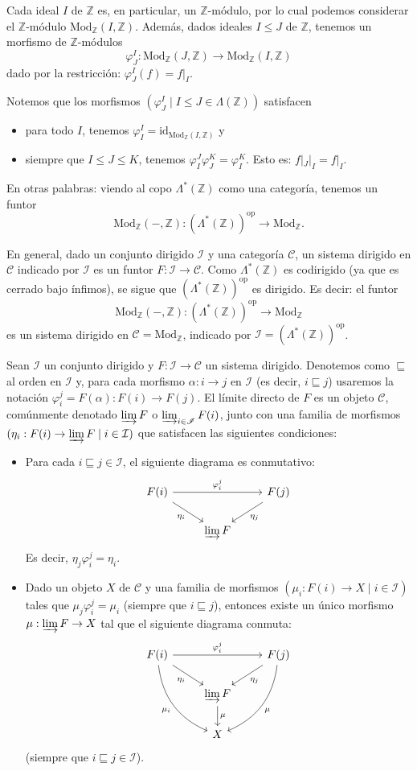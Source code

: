 \documentclass[12pt,letterpaper,titlepage]{article}
\theoremstyle{definition}
\renewcommand\phi{\varphi}
\newcommand\Z{\mathbb Z}
\renewcommand\cal[1]{\mathcal{#1}}
\newcommand\nti[1]{\Lambda^{\text{*}}({#1})}
\newcommand\scr[1]{\mathscr{#1}}
\newcommand\<{\langle}
\renewcommand\>{\rangle}
\newcommand{\Mod}{\mathrm{Mod}}
\newcommand{\id}{\mathrm{id}}
\newcommand{\op}{\mathrm{op}}
\begin{document}
Cada ideal $I$ de $\Z$ es, en particular, un $\Z$-módulo,
por lo cual podemos considerar el $\Z$-módulo $\Mod_\Z(I,\Z)$.
Además, dados ideales $I\leq J$ de $\Z$,
tenemos un morfismo de $\Z$-módulos
\[
    \phi^I_J:\Mod_\Z(J,\Z)\to\Mod_\Z(I,\Z)
\]
dado por la restricción: $\phi^I_J(f)=f|_I$.

Notemos que los morfismos $(\phi^I_J\mid I\leq J\in\Lambda(\Z))$
satisfacen
\begin{itemize}
    \item para todo $I$, tenemos $\phi^I_I=\id_{\Mod_\Z(I,\Z)}$ y
    \item siempre que $I\leq J\leq K$, tenemos
    $\phi^J_I\phi^K_J=\phi^K_I$. Esto es: $f|_J|_I=f|_I$.
\end{itemize}

En otras palabras: viendo al copo $\nti\Z$
como una categoría, tenemos un funtor
\[
    \Mod_\Z(-,\Z):(\nti\Z)^\op\to\Mod_\Z
.\]

En general, dado un conjunto dirigido $\scr I$
y una categoría $\cal C$,
un sistema dirigido en $\cal C$ indicado por $\scr I$
es un funtor $F:\scr I\to\cal C$.
Como $\nti\Z$ es codirigido (ya que es cerrado bajo ínfimos),
se sigue que $(\nti\Z)^\op$ es dirigido.
Es decir: el funtor
\[
    \Mod_\Z(-,\Z):(\nti\Z)^\op\to\Mod_\Z
\]
es un sistema dirigido en $\cal C=\Mod_\Z$,
indicado por $\scr I = (\nti\Z)^\op$.

Sean $\scr I$ un conjunto dirigido
y $F:\scr I\to\cal C$ un sistema dirigido.
Denotemos como $\sqsubseteq$ al orden en $\scr I$ y,
para cada morfismo $\alpha:i\to j$ en $\scr I$
(es decir, $i\sqsubseteq j$) usaremos la notación
$\phi_i^j=F(\alpha):F(i)\to F(j)$.
El límite directo de $F$ es un objeto $\cal C$,
comúnmente denotado $\varinjlim F$ o $\varinjlim_{i\in\scr I}F(i)$,
junto con una familia de morfismos
$(\eta_i:F(i)\to\varinjlim F \mid i\in\cal I)$
que satisfacen las siguientes condiciones:
\begin{itemize}
    \item Para cada $i\sqsubseteq j\in\scr I$,
    el siguiente diagrama es conmutativo:
    \[
        \begin{tikzcd}
            F(i) \ar[rr,"\phi_i^j"] \ar[dr,"\eta_i"']
            && F(j) \ar[dl,"\eta_j"] \\
                & \varinjlim F
        \end{tikzcd}
    \]
    Es decir, $\eta_j\phi_i^j=\eta_i$.
    \item Dado un objeto $X$ de $\cal C$
    y una familia de morfismos $(\mu_i:F(i)\to X\mid i\in\cal I)$
    tales que $\mu_j\phi_i^j=\mu_i$ (siempre que $i\sqsubseteq j$),
    entonces existe un único morfismo $\mu:\varinjlim F\to X$
    tal que el siguiente diagrama conmuta:
    \[
        \begin{tikzcd}
            F(i) \ar[rr,"\phi_i^j"] \ar[dr,"\eta_i"']
            \ar[ddr,"\mu_i"',bend right] 
            && F(j) \ar[dl,"\eta_j"] \ar[ddl,"\mu",bend left] \\
                & \varinjlim F \ar[d,"\mu"] \\
                & X
        \end{tikzcd}
    \]
    (siempre que $i\sqsubseteq j\in\scr I$).
\end{itemize}
\end{document}
